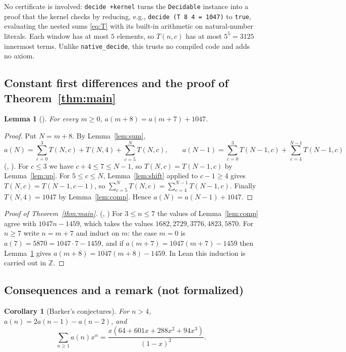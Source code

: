 \documentclass[11pt]{amsart}
\theoremstyle{plain}
\newtheorem{lemma}[theorem]{Lemma}
\newtheorem{corollary}[theorem]{Corollary}
\theoremstyle{definition}
\newcommand{\Z}{\mathbb{Z}}
\begin{document}
No certificate is involved: \texttt{decide +kernel} turns the \texttt{Decidable} instance into a proof that the kernel checks by reducing, e.g., \texttt{decide (T 8 4 = 1047)} to \texttt{true}, evaluating the nested sums \eqref{eq:T} with its built-in arithmetic on natural-number literals. Each window has at most $5$ elements, so $T(n,c)$ has at most $5^5=3125$ innermost terms. Unlike \texttt{native\_decide}, this trusts no compiled code and adds no axiom.

\subsection{Constant first differences and the proof of Theorem~\ref{thm:main}}

\begin{lemma}[]\label{lem:step}
For every $m\ge0$, $a(m+8)=a(m+7)+1047$.
\end{lemma}

\begin{proof}
Put $N=m+8$. By Lemma~\ref{lem:sum},
\[
  a(N)=\sum_{c=0}^{3}T(N,c)+T(N,4)+\sum_{c=5}^{N}T(N,c),\qquad
  a(N-1)=\sum_{c=0}^{3}T(N-1,c)+\sum_{c=4}^{N-1}T(N-1,c)
\]
(, ). For $c\le3$ we have $c+4\le7\le N-1$, so $T(N,c)=T(N-1,c)$ by Lemma~\ref{lem:up}. For $5\le c\le N$, Lemma~\ref{lem:shift} applied to $c-1\ge4$ gives $T(N,c)=T(N-1,c-1)$, so $\sum_{c=5}^{N}T(N,c)=\sum_{c=4}^{N-1}T(N-1,c)$. Finally $T(N,4)=1047$ by Lemma~\ref{lem:comp}. Hence $a(N)=a(N-1)+1047$.
\end{proof}

\begin{proof}[Proof of Theorem~\ref{thm:main}] (, )
For $3\le n\le7$ the values of Lemma~\ref{lem:comp} agree with $1047n-1459$, which takes the values $1682, 2729, 3776, 4823, 5870$. For $n\ge7$ write $n=m+7$ and induct on $m$: the case $m=0$ is $a(7)=5870=1047\cdot7-1459$, and if $a(m+7)=1047(m+7)-1459$ then Lemma~\ref{lem:step} gives $a(m+8)=1047(m+8)-1459$. In Lean this induction is carried out in $\Z$.
\end{proof}

\subsection{Consequences and a remark (not formalized)}

\begin{corollary}[Barker's conjectures]\label{cor:barker}
For $n>4$, $a(n)=2a(n-1)-a(n-2)$, and
\[
  \sum_{n\ge1}a(n)x^n=\frac{x(64+601x+288x^2+94x^3)}{(1-x)^2}.
\]
\end{corollary}
\end{document}
